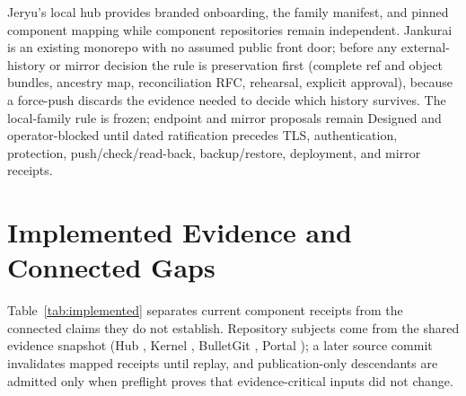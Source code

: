\documentclass[journal]{IEEEtran}
\newcommand{\Designed}{\textsf{Designed}}
\begin{document}
Jeryu's local hub provides branded onboarding, the family manifest, and pinned
component mapping while component repositories remain independent. Jankurai
is an existing monorepo with no assumed public front door; before any
external-history or mirror decision the rule is preservation first (complete
ref and object bundles, ancestry map, reconciliation RFC, rehearsal, explicit
approval), because a force-push discards the evidence needed to decide which
history survives. The local-family rule is frozen; endpoint and mirror
proposals remain \Designed{} and operator-blocked until dated ratification
precedes TLS, authentication, protection, push/check/read-back,
backup/restore, deployment, and mirror receipts.

\section{Implemented Evidence and Connected Gaps}
\label{sec:evidence}

Table~\ref{tab:implemented} separates current component receipts from the
connected claims they do not establish. Repository subjects come from the
shared evidence snapshot (Hub \EvidenceHubCommit, Kernel
\EvidenceKernelCommit, BulletGit \EvidenceGitCommit, Portal
\EvidencePortalCommit); a later source commit invalidates mapped receipts
until replay, and publication-only descendants are admitted only when
preflight proves that evidence-critical inputs did not change.
\end{document}
